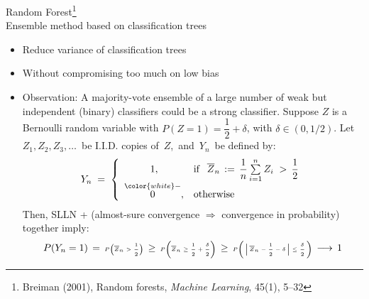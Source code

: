 \begin{frame}{\vskip -0.3cm \LARGE Random Forest\!\!\footnote{\scriptsize Breiman (2001), Random forests, \textit{Machine Learning}, 45(1), 5--32}\\{\small Ensemble method based on classification trees}}

\scriptsize
\begin{itemize}
\pause
\item
	{\normalsize Reduce variance of classification trees}
	
\vskip 0.3cm
\pause
\item
	{\normalsize Without compromising too much on low bias}

\vskip 0.3cm
\pause
\item
	{\small Observation: A majority-vote ensemble of a {\color{red}large} number of
	weak but {\color{red}independent} (binary) classifiers could be a strong classifier.}
	\vskip 0.1cm
	\pause
	Suppose $Z$ is a Bernoulli random variable
	with $P(Z = 1) = \dfrac{1}{2} + \delta$, with $\delta \in (0,1/2)$.\;
	Let \,$Z_{1}, Z_{2}, Z_{3}, \ldots$\, be I.I.D. copies of \,$Z$,\, and
	\pause
	\,$Y_{n}$\, be defined by:
	\vskip -0.1cm
	\begin{equation*}
	Y_{n}
	\; = \;
		\left\{\begin{array}{cl}
			1, & \textnormal{if \;\,$\overline{Z}_{n} \,:=\,
				\dfrac{1}{n}\,\overset{n}{\underset{i=1}{\sum}}\,Z_{i} \;>\,\dfrac{1}{2}$}
			\\
			\overset{{\color{white}-}}{0}, & \textnormal{otherwise}
		\end{array}\right.
	\end{equation*}
	\pause
	Then, SLLN + (almost-sure convergence $\Rightarrow$ convergence in probability) together imply:
	\vskip -0.4cm
	\begin{equation*}
	P\!\left(Y_{n} = 1\right)
	\,=\, \textnormal{\tiny$P\!\left(\overline{Z}_{n} > \dfrac{1}{2}\right)$}
	\,\geq\, \textnormal{\tiny$P\!\left(\overline{Z}_{n} \geq \dfrac{1}{2} + \dfrac{\delta}{2}\right)$}
	\,\geq\, \textnormal{\tiny
		$P\!\left(\,\left\vert\,\overline{Z}_{n} - \dfrac{1}{2} - \delta\,\right\vert \leq \dfrac{\delta}{2}\,\right)$}
	\,\longrightarrow\,
		1
	\end{equation*}
\end{itemize}

\end{frame}
\normalsize


